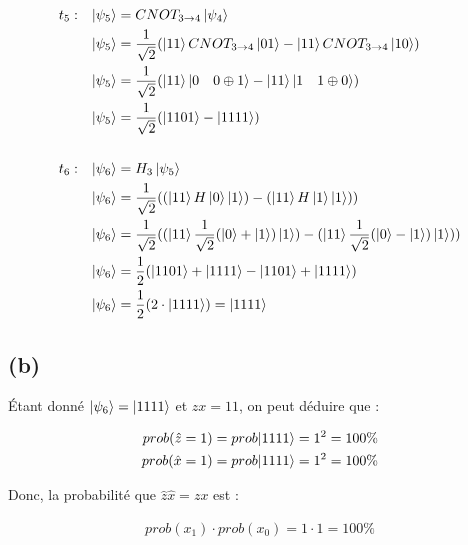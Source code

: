 \documentclass{article}
\begin{document}
\begin{align*}
&t_5:&  \ket{\psi_5} &= CNOT_{3\rightarrow4}\ket{\psi_4} \\
&&      \ket{\psi_5} &= \frac{1}{\sqrt{2}}(\ket{11}CNOT_{3\rightarrow4}\ket{01} - \ket{11}CNOT_{3\rightarrow4}\ket{10}) \\
&&      \ket{\psi_5} &= \frac{1}{\sqrt{2}}(\ket{11}\ket{0 \quad 0 \oplus 1} - \ket{11}\ket{1 \quad 1 \oplus 0}) \\
&&      \ket{\psi_5} &= \frac{1}{\sqrt{2}}(\ket{1101} - \ket{1111}) \\ \\ 
&t_6:&  \ket{\psi_6} &= H_3\ket{\psi_5} \\
&&      \ket{\psi_6} &= \frac{1}{\sqrt{2}}((\ket{11}H\ket{0}\ket{1}) - (\ket{11}H\ket{1}\ket{1})) \\
&&      \ket{\psi_6} &= \frac{1}{\sqrt{2}}((\ket{11}\frac{1}{\sqrt{2}}(\ket{0} + \ket{1})\ket{1}) - (\ket{11}\frac{1}{\sqrt{2}}(\ket{0} - \ket{1})\ket{1})) \\
&&      \ket{\psi_6} &= \frac{1}{2}(\ket{1101} + \ket{1111} - \ket{1101} + \ket{1111}) \\
&&      \ket{\psi_6} &= \frac{1}{2}(2\cdot\ket{1111}) = \ket{1111}
\end{align*}
\hspace*{\fill}
\subsection*{(b)}
\begin{flushleft}
    Étant donné $\ket{\psi_6} = \ket{1111}$ et $zx = 11$, on peut déduire que : \\
\end{flushleft}
\begin{align*}
    prob(\hat{z} = 1) = prob{\ket{1111}} = 1^2 = 100\% \\
    prob(\hat{x} = 1) = prob{\ket{1111}} = 1^2 = 100\% \\
\end{align*}
\begin{flushleft}
    Donc, la probabilité que $\hat{z}\hat{x} = zx$ est : \\
\end{flushleft}
    \begin{align*} prob(x_1)\cdot prob(x_0) = 1 \cdot 1 = 100\% \end{align*}
\hspace*{\fill}
\end{document}
